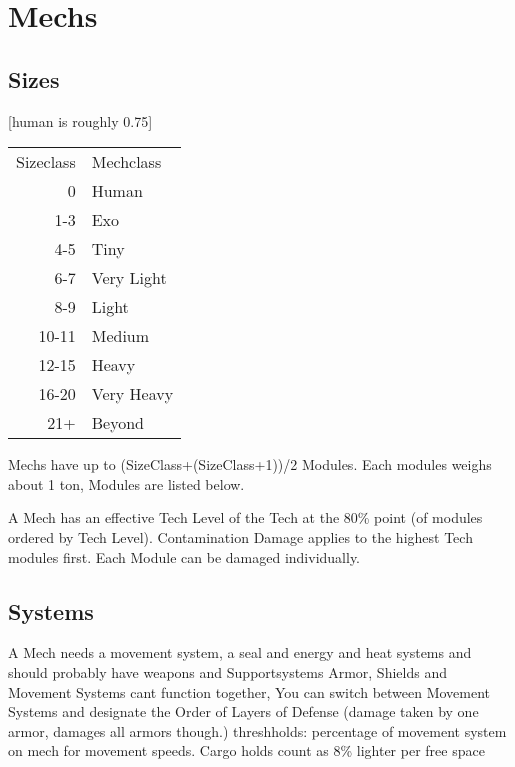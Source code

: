 \documentclass{article}
\begin{document}
    \section{Mechs}

    \subsection{Sizes}
    [human is roughly 0.75]\par
    \begin{tabular}{r|l}
        Sizeclass &Mechclass \\
          0 &Human\\
        1-3 &Exo\\
        4-5 &Tiny\\
        6-7 &Very Light\\
        8-9 &Light\\
        10-11 &Medium\\
        12-15 &Heavy\\
        16-20 &Very Heavy\\
        21+ &Beyond\\
    \end{tabular}\newline
    Mechs have up to (SizeClass+(SizeClass+1))/2 Modules. Each modules weighs about 1 ton, Modules are listed below. \par
    A Mech has an effective Tech Level of the Tech at the 80\% point (of modules ordered by Tech Level).\newline
    Contamination Damage applies to the highest Tech modules first. Each Module can be damaged individually.\newline
    \newline

    \subsection{Systems}
    A Mech needs a movement system, a seal and energy and heat systems and should probably have weapons and Supportsystems\newline
    Armor, Shields and Movement Systems cant function together, You can switch between Movement Systems and designate the
    Order of Layers of Defense (damage taken by one armor, damages all armors though.)
    threshholds: percentage of movement system on mech for movement speeds. Cargo holds count as 8\% lighter per
    free space\newline
\end{document}
